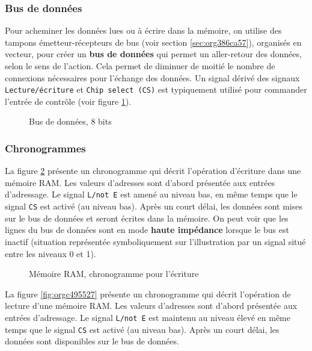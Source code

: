 \documentclass[11pt]{article}
\begin{document}
\subsubsection{Bus de données}
\label{sec:org4fa5c44}

Pour acheminer les données lues ou à écrire dans la mémoire, on
utilise des tampons émetteur-récepteurs de bus (voir section \ref{sec:org386ca57}), organisés en vecteur, pour créer un
\textbf{bus de données} qui permet un aller-retour des données, selon le sens
de l'action. Cela permet de diminuer de moitié le nombre de connexions
nécessaires pour l'échange des données.  Un signal dérivé des signaux
\texttt{Lecture/écriture} et \texttt{Chip select (CS)} est typiquement utilisé pour
commander l'entrée de contrôle (voir figure \ref{fig:org96948be}).

\begin{figure}[htbp]
\centering

\caption{\label{fig:org96948be}Bus de données, 8 bits}
\end{figure}

\subsubsection{Chronogrammes}
\label{sec:org799b71c}

La figure \ref{fig:org9faebb0} présente un chronogramme qui décrit
l'opération d'écriture dans une mémoire RAM. Les valeurs d'adresses
sont d'abord présentée aux entrées d'adressage.  Le signal \texttt{L/not E}
est amené au niveau bas, en même temps que le signal \texttt{CS} est activé
(au niveau bas). Après un court délai, les données sont mises sur le
bus de données et seront écrites dans la mémoire. On peut voir que les
lignes du bus de données sont en mode \textbf{haute impédance} lorsque le bus
est inactif (situation représentée symboliquement sur l'illustration
par un signal situé entre les niveaux 0 et 1).

\begin{figure}[htbp]
\centering

\caption{\label{fig:org9faebb0}Mémoire RAM, chronogramme pour l'écriture}
\end{figure}

La figure \ref{fig:orgc495527} présente un chronogramme qui décrit
l'opération de lecture d'une mémoire RAM. Les valeurs d'adresses sont
d'abord présentée aux entrées d'adressage.  Le signal \texttt{L/not E} est
maintenu au niveau élevé en même temps que le signal \texttt{CS} est activé
(au niveau bas). Après un court délai, les données sont disponibles sur
le bus de données.
\end{document}
